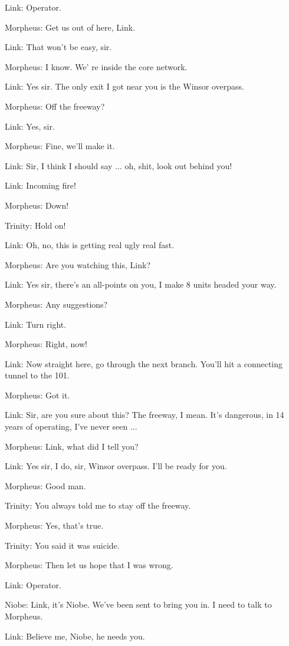 \documentclass[UTF8]{ctexart}
\newenvironment{myquote}{\color{green} \setlength{\leftskip}{6em} \setlength{\rightskip}{4em} \setlength{\parindent}{-2em}}{\par}
\begin{document}
\begin{myquote}
Link: Operator.

Morpheus: Get us out of here, Link.

Link: That won't be easy, sir.

Morpheus: I know. We' re inside the core network.

Link: Yes sir. The only exit I got near you is the Winsor overpass.

Morpheus: Off the freeway?

Link: Yes, sir.

Morpheus: Fine, we'll make it.

Link: Sir, I think I should say ... oh, shit, look out behind you!

Link: Incoming fire!

Morpheus: Down!

Trinity: Hold on!

Link: Oh, no, this is getting real ugly real fast.

Morpheus: Are you watching this, Link?

Link: Yes sir, there's an all-points on you, I make 8 units headed your way.

Morpheus: Any suggestions?

Link: Turn right.

Morpheus: Right, now!

Link: Now straight here, go through the next branch. You'll hit a connecting tunnel to the 101.

Morpheus: Got it.

Link: Sir, are you sure about this? The freeway, I mean. It's dangerous, in 14 years of operating, I've never seen ...

Morpheus: Link, what did I tell you?

Link: Yes sir, I do, sir, Winsor overpass. I'll be ready for you.

Morpheus: Good man.

Trinity: You always told me to stay off the freeway.

Morpheus: Yes, that's true.

Trinity: You said it was suicide.

Morpheus: Then let us hope that I was wrong.

Link: Operator.

Niobe: Link, it's Niobe. We've been sent to bring you in. I need to talk to Morpheus.

Link: Believe me, Niobe, he needs you.


\end{myquote}
\end{document}
